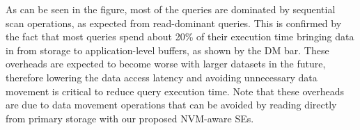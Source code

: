 As can be seen in the figure, most of the queries are dominated
by sequential scan operations, as expected from read-dominant queries.
This is confirmed by the fact
that most queries spend about 20\% of their execution time bringing
data in from storage to application-level buffers, as shown by
the DM bar.  These overheads are expected to become worse with larger datasets in the future, therefore
lowering the data access latency and avoiding unnecessary data movement is
critical to reduce query execution time. Note that these overheads are due to
data movement operations that can be avoided by reading directly from primary storage with our proposed NVM-aware SEs.
